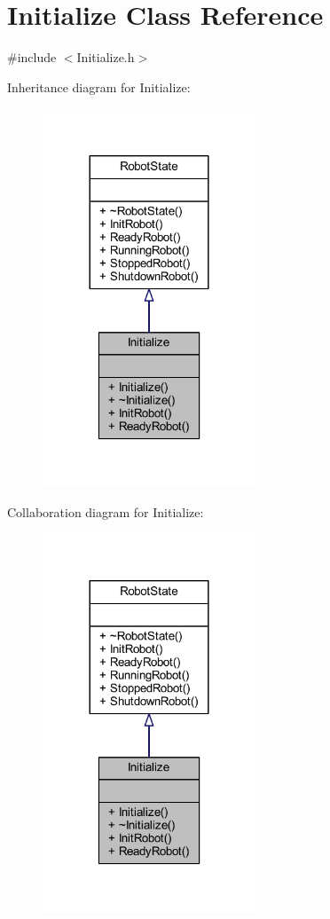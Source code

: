 \hypertarget{class_initialize}{}\section{Initialize Class Reference}
\label{class_initialize}


{\ttfamily \#include $<$Initialize.\+h$>$}



Inheritance diagram for Initialize\+:
\nopagebreak
\begin{figure}[H]
\begin{center}
\leavevmode
\includegraphics[width=180pt]{class_initialize__inherit__graph}
\end{center}
\end{figure}


Collaboration diagram for Initialize\+:
\nopagebreak
\begin{figure}[H]
\begin{center}
\leavevmode
\includegraphics[width=180pt]{class_initialize__coll__graph}
\end{center}
\end{figure}
